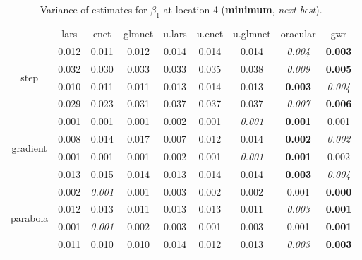 \documentclass[authoryear, review, 11pt]{elsarticle}
\begin{document}
\begin{table}[ht]
\begin{center}
\begin{tabular}{ccccccccc}
  & lars & enet & glmnet & u.lars & u.enet & u.glmnet & oracular & gwr \\ 
  \cline{2-9}
  \multirow{4}{*}{step} & 0.012 & 0.011 & 0.012 & 0.014 & 0.014 & 0.014 & \emph{0.004} & \textbf{0.003} \\ 
  & 0.032 & 0.030 & 0.033 & 0.033 & 0.035 & 0.038 & \emph{0.009} & \textbf{0.005} \\ 
  & 0.010 & 0.011 & 0.011 & 0.013 & 0.014 & 0.013 & \textbf{0.003} & \emph{0.004} \\ 
  & 0.029 & 0.023 & 0.031 & 0.037 & 0.037 & 0.037 & \emph{0.007} & \textbf{0.006} \\ 
  \cline{2-9}
  \multirow{4}{*}{gradient} & 0.001 & 0.001 & 0.001 & 0.002 & 0.001 & \emph{0.001} & \textbf{0.001} & 0.001 \\ 
  & 0.008 & 0.014 & 0.017 & 0.007 & 0.012 & 0.014 & \textbf{0.002} & \emph{0.002} \\ 
  & 0.001 & 0.001 & 0.001 & 0.002 & 0.001 & \emph{0.001} & \textbf{0.001} & 0.002 \\ 
  & 0.013 & 0.015 & 0.014 & 0.013 & 0.014 & 0.014 & \textbf{0.003} & \emph{0.004} \\ 
  \cline{2-9}
  \multirow{4}{*}{parabola} & 0.002 & \emph{0.001} & 0.001 & 0.003 & 0.002 & 0.002 & 0.001 & \textbf{0.000} \\ 
  & 0.012 & 0.013 & 0.011 & 0.013 & 0.013 & 0.011 & \emph{0.003} & \textbf{0.001} \\ 
  & 0.001 & \emph{0.001} & 0.002 & 0.003 & 0.001 & 0.003 & 0.001 & \textbf{0.001} \\ 
  & 0.011 & 0.010 & 0.010 & 0.014 & 0.012 & 0.013 & \emph{0.003} & \textbf{0.003} \\ 
  \end{tabular}
\caption{Variance of estimates for $\beta_1$ at location 4 (\textbf{minimum}, \emph{next best}).\label{table:loc4-X1-varx}}
\end{center}
\end{table}
\end{document}
